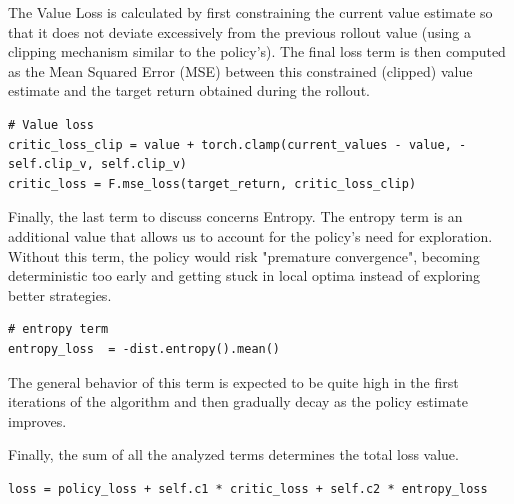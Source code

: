 \documentclass[main.tex]{subfiles}
\begin{document}
The Value Loss is calculated by first constraining the current value estimate so that it does not deviate excessively from the previous rollout value (using a clipping mechanism similar to the policy's). The final loss term is then computed as the Mean Squared Error (MSE) between this constrained (clipped) value estimate and the target return obtained during the rollout.

\begin{listing}[H]
	\centering
	\caption{Computation Clipped Value Loss} 
	\label{codice:value_loss}
	\begin{verbatim}
# Value loss
critic_loss_clip = value + torch.clamp(current_values - value, -self.clip_v, self.clip_v) 
critic_loss = F.mse_loss(target_return, critic_loss_clip)
	\end{verbatim}
\end{listing}

Finally, the last term to discuss concerns Entropy. The entropy term is an additional value that allows us to account for the policy's need for exploration. Without this term, the policy would risk "premature convergence", becoming deterministic too early and getting stuck in local optima instead of exploring better strategies.

\begin{listing}[H]
	\centering
	\caption{Computation Entropy Loss} 
	\label{codice:entropy_loss}
	\begin{verbatim}
# entropy term
entropy_loss  = -dist.entropy().mean()
	\end{verbatim}
\end{listing}

The general behavior of this term is expected to be quite high in the first iterations of the algorithm and then gradually decay as the policy estimate improves.

Finally, the sum of all the analyzed terms determines the total loss value. 

\begin{listing}[H]
	\centering
	\caption{Target return computation respect GAE value} 
	\label{codice:loss}
	\begin{verbatim}
loss = policy_loss + self.c1 * critic_loss + self.c2 * entropy_loss
	\end{verbatim}
\end{listing}
\end{document}
